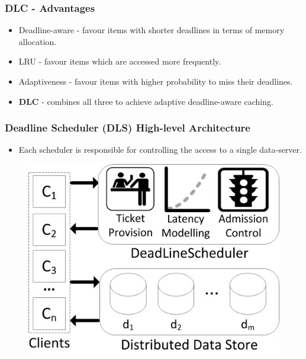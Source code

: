 \documentclass{beamer}
\newcommand{\myv}{\vspace{3 mm}}
\begin{document}
\begin{frame}
  \frametitle{DLC - Advantages}
  \vspace{-15 mm}
  \begin{itemize}
  \item Deadline-aware - favour items with shorter deadlines in terms
    of memory allocation. \myv
  \item LRU - favour items which are accessed more frequently. \myv
  \item Adaptiveness - favour items with higher probability to miss their
    deadlines.  \myv
  \item \textbf{DLC} - combines all three to achieve adaptive deadline-aware caching.
  \end{itemize}
\end{frame}


\begin{frame}
  \frametitle{Deadline Scheduler (DLS) High-level Architecture}
  \begin{itemize}
  \item Each scheduler is responsible for
    controlling the access to a single data-server.
  \end{itemize}
  \begin{figure}
    \begin{center}
      \centerline{\includegraphics[scale=0.90]{img/DLS.png}}
    \end{center}
  \end{figure}
\end{frame}
\end{document}
